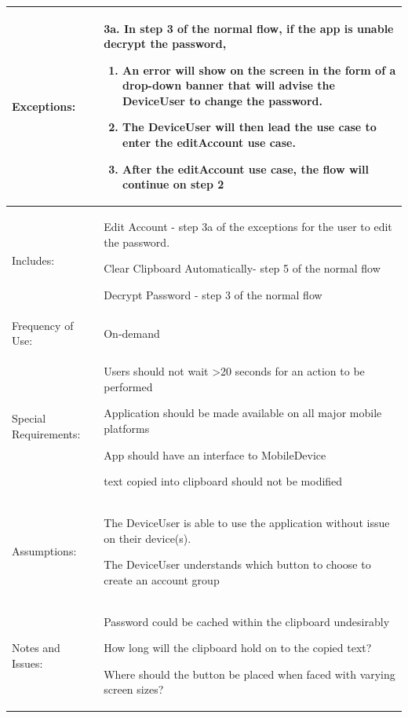\documentclass[stu]{apa7}
\newcommand{\nextitem}{\par\hspace*{\labelsep}\textbullet\hspace*{\labelsep}}
\newcommand{\nextitemblank}{\par\hspace*{\labelsep}\hspace*{\labelsep}}
\begin{document}
{\begin{xltabular}{\textwidth}{|l|X|}
              Exceptions: & 3a. In step 3 of the normal flow, if the app is unable decrypt the password,
                            \begin{enumerate}
                              \item An error will show on the screen in the form of a drop-down banner that will advise the DeviceUser to change the password.
                              \item The DeviceUser will then lead the use case to enter the editAccount use case.
                              \item After the editAccount use case, the flow will continue on step 2
                            \end{enumerate} \\ \hline

              Includes: & \nextitemblank Edit Account - step 3a of the exceptions for the user to edit the password.
                          \nextitemblank Clear Clipboard Automatically- step 5 of the normal flow
                          \nextitemblank Decrypt Password - step 3 of the normal flow \\ \hline


              Frequency of Use: & On-demand \\ \hline

              Special Requirements: & \nextitem Users should not wait >20 seconds for an action to be performed
                                      \nextitem Application should be made available on all major mobile platforms
                                      \nextitem App should have an interface to MobileDevice
                                      \nextitem text copied into clipboard should not be modified \\ \hline


              Assumptions: & \nextitem The DeviceUser is able to use the application without issue on their device(s).
                             \nextitem The DeviceUser understands which button to choose to create an account group \\ \hline

              Notes and Issues: & \nextitem Password could be cached within the clipboard undesirably
                                  \nextitem How long will the clipboard hold on to the copied text?
                                  \nextitem Where should the button be placed when faced with varying screen sizes? \\ \hline

\end{xltabular}}
\end{document}
